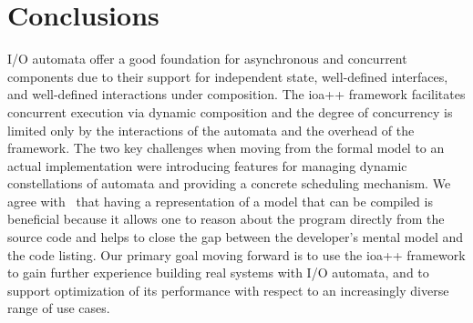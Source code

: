 \section{Conclusions\label{conclusion}}

I/O automata offer a good foundation for asynchronous and concurrent components due to their support for independent state, well-defined interfaces, and well-defined interactions under composition.
The ioa++ framework facilitates concurrent execution via dynamic composition and the degree of concurrency is limited only by the interactions of the automata and the overhead of the framework.
The two key challenges when moving from the formal model to an actual implementation were introducing features for managing dynamic constellations of automata and providing a concrete scheduling mechanism.
We agree with~\cite{georgiou2009automated} that having a representation of a model that can be compiled is beneficial because it allows one to reason about the program directly from the source code and helps to close the gap between the developer's mental model and the code listing.
Our primary goal moving forward is to use the ioa++ framework to gain further experience building real systems with I/O automata, and to support optimization of its performance with respect to an increasingly diverse range of use cases.


